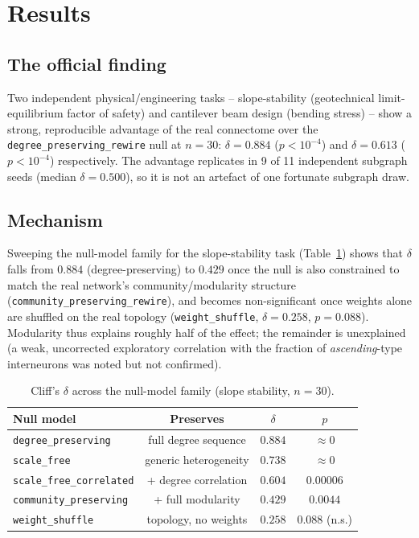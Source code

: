 \documentclass[11pt]{article}
\begin{document}
\section{Results}

\subsection{The official finding}

Two independent physical/engineering tasks -- slope-stability
(geotechnical limit-equilibrium factor of safety) and cantilever beam
design (bending stress) -- show a strong, reproducible advantage of the
real connectome over the \texttt{degree\_preserving\_rewire} null at
$n=30$: $\delta = 0.884$ ($p < 10^{-4}$) and $\delta = 0.613$
($p<10^{-4}$) respectively. The advantage replicates in 9 of 11
independent subgraph seeds (median $\delta = 0.500$), so it is not an
artefact of one fortunate subgraph draw.

\subsection{Mechanism}

Sweeping the null-model family for the slope-stability task
(Table~\ref{tab:mechanism}) shows that $\delta$ falls from $0.884$
(degree-preserving) to $0.429$ once the null is also constrained to
match the real network's community/modularity structure
(\texttt{community\_preserving\_rewire}), and becomes non-significant
once weights alone are shuffled on the real topology
(\texttt{weight\_shuffle}, $\delta = 0.258$, $p=0.088$). Modularity thus
explains roughly half of the effect; the remainder is unexplained
(a weak, uncorrected exploratory correlation with the fraction of
\emph{ascending}-type interneurons was noted but not confirmed).

\begin{table}[h]
\centering
\caption{Cliff's $\delta$ across the null-model family (slope stability,
$n=30$).}
\label{tab:mechanism}
\begin{tabular}{lccc}
\toprule
Null model & Preserves & $\delta$ & $p$ \\
\midrule
\texttt{degree\_preserving} & full degree sequence & $0.884$ & $\approx 0$ \\
\texttt{scale\_free} & generic heterogeneity & $0.738$ & $\approx 0$ \\
\texttt{scale\_free\_correlated} & + degree correlation & $0.604$ & $0.00006$ \\
\texttt{community\_preserving} & + full modularity & $0.429$ & $0.0044$ \\
\texttt{weight\_shuffle} & topology, no weights & $0.258$ & $0.088$ (n.s.) \\
\bottomrule
\end{tabular}
\end{table}
\end{document}
